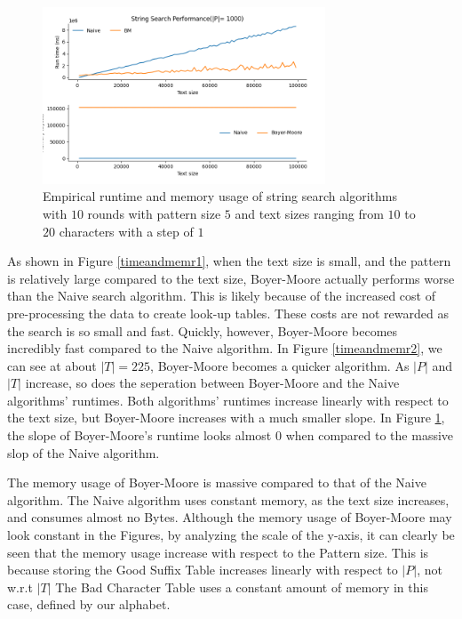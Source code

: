 \documentclass[11pt, letterpaper]{article}
\begin{document}
\begin{figure}[H] \centering
    \includegraphics[width=0.75\textwidth]{time_mem/r4.png}
    \caption{Empirical runtime and memory usage of string search algorithms with $10$ rounds with pattern size $5$ and text sizes ranging from $10$ to $20$ characters with a step of $1$}
    \label{timeandmemr4}
\end{figure}

As shown in Figure \ref{timeandmemr1}, when the text size is small, and the pattern is relatively large compared to the text size, Boyer-Moore actually performs worse than the Naive search algorithm. This is likely because of the increased cost of pre-processing the data to create look-up tables. These costs are not rewarded as the search is so small and fast. Quickly, however, Boyer-Moore becomes incredibly fast compared to the Naive algorithm. In Figure \ref{timeandmemr2}, we can see at about $|T| = 225$, Boyer-Moore becomes a quicker algorithm. As $|P|$ and $|T|$ increase, so does the seperation between Boyer-Moore and the Naive algorithms' runtimes. Both algorithms' runtimes increase linearly with respect to the text size, but Boyer-Moore increases with a much smaller slope. In Figure \ref{timeandmemr4}, the slope of Boyer-Moore's runtime looks almost $0$ when compared to the massive slop of the Naive algorithm. 

The memory usage of Boyer-Moore is massive compared to that of the Naive algorithm. The Naive algorithm uses constant memory, as the text size increases, and consumes almost no Bytes. Although the memory usage of Boyer-Moore may look constant in the Figures, by analyzing the scale of the y-axis, it can clearly be seen that the memory usage increase with respect to the Pattern size. This is because storing the Good Suffix Table increases linearly with respect to $|P|$, not w.r.t $|T|$ The Bad Character Table uses a constant amount of memory in this case, defined by our alphabet. 
\end{document}
